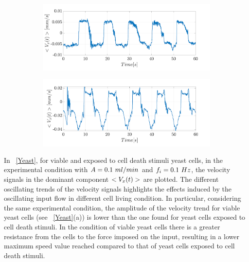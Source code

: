 \documentclass[journal]{IEEEtran}
\theoremstyle{definition}
\theoremstyle{remark}
\begin{document}
\begin{figure}[t]
	\centering
	\begin{subfigure}[b]{\columnwidth}
		\centering
		\includegraphics[width=1\columnwidth]{images/YeastA}
		\caption{}
		\label{A}
	\end{subfigure}
	\begin{subfigure}[b]{\columnwidth}
		\centering
		\includegraphics[width=1\columnwidth]{images/YeastB}
		\caption{}
		\label{B}
	\end{subfigure}
\end{figure}  

In ~\fig\ref{Yeast}, for viable and exposed to cell death stimuli yeast cells, in the experimental condition with $A=0.1~ml/min$ and  $f_i=0.1~Hz$, the velocity signals in the dominant component  $<V_{x}(t)>$ are plotted. The different oscillating trends of the velocity signals highlights the effects induced by the oscillating input flow in different cell living condition. In particular, considering the same experimental condition, the amplitude of the velocity trend for viable yeast cells (see ~\fig\ref{Yeast}(a)) is lower than the one found for yeast cells exposed to cell death stimuli. 
In the condition of viable yeast cells there is a greater resistance from the cells to the force imposed on the input, resulting in a lower maximum speed value reached compared to that of yeast cells exposed to cell death stimuli.
\end{document}
